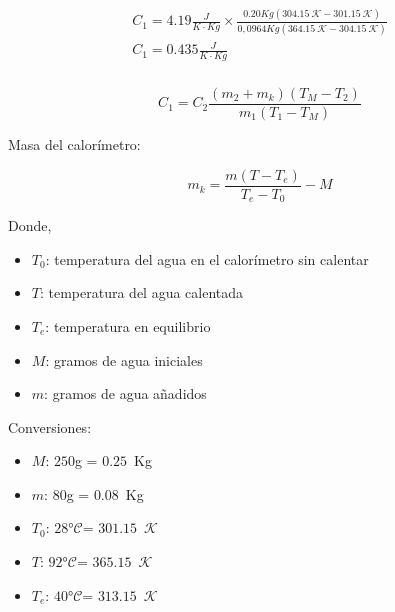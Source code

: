 \documentclass[letterpaper, 12pt]{article}
\newcommand{\Celsius}[0]{°$\mathcal{C}$}
\newcommand{\Kelvin}[0]{$\mathcal{K}$}
\begin{document}
\begin{equation*}
      \begin{gathered}
            C_{1} = 4.19 \frac{J}{K \cdot Kg} \times \frac{0.20 Kg (304.15~\mathcal{K} - 301.15~\mathcal{K})}{0,0964 Kg(364.15~\mathcal{K} - 304.15~\mathcal{K})} \\
            C_{1} = 0.435 \frac{J}{K \cdot Kg}
      \end{gathered}
\end{equation*}

\subsubsection{}

\begin{equation}
      C_{1} = C_{2} \frac{(m_{2} + m_{k})(T_{M} - T_{2})}{m_{1}(T_{1} - T_{M})}
      \label{eq:calor_especifico_2}
\end{equation}

Masa del calorímetro:

\begin{equation}
      m_{k} = \frac{m(T - T_{e})}{T_{e} - T_{0}} - M
      \label{eq:masa_calorimetro}
\end{equation}

Donde,

\begin{itemize}[label=$\triangleright$]
      \item $T_{0}$: temperatura del agua en el calorímetro sin calentar
      \item $T$: temperatura del agua calentada
      \item $T_{e}$: temperatura en equilibrio
      \item $M$: gramos de agua iniciales
      \item $m$: gramos de agua añadidos
\end{itemize}

Conversiones:

\begin{itemize}
      \item $M$: $250$g = $0.25$~Kg
      \item $m$: $80$g = $0.08$~Kg
      \item $T_{0}$: $28$\Celsius = $301.15$~\Kelvin
      \item $T$: $92$\Celsius = $365.15$~\Kelvin
      \item $T_{e}$: $40$\Celsius = $313.15$~\Kelvin
\end{itemize}
\end{document}
